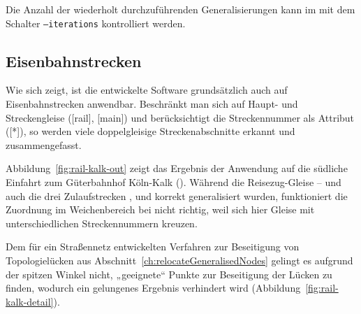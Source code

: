 \documentclass[../main/thesis.tex]{subfiles}
\begin{document}

Die Anzahl der wiederholt durchzuführenden Generalisierungen kann im  mit dem Schalter \texttt{--iterations} kontrolliert werden.




\subsection{Eisenbahnstrecken}

Wie sich zeigt, ist die entwickelte Software grundsätzlich auch auf Eisenbahnstrecken anwendbar.
Beschränkt man sich auf Haupt- und Streckengleise ([rail], [main]) und berücksichtigt die Streckennummer als Attribut ([*]), so werden viele doppelgleisige Streckenabschnitte erkannt und zusammengefasst.

Abbildung~\ref{fig:rail-kalk-out} zeigt das Ergebnis der Anwendung auf die südliche Einfahrt zum Güterbahnhof Köln-Kalk ().
Während die Reisezug-Gleise -- und auch die drei Zulaufstrecken ,  und  korrekt generalisiert wurden, funktioniert die Zuordnung im Weichenbereich bei  nicht richtig, weil sich hier Gleise mit unterschiedlichen Streckennummern kreuzen.

Dem für ein Straßennetz entwickelten Verfahren zur Beseitigung von Topologielücken aus Abschnitt~\ref{ch:relocateGeneralisedNodes} gelingt es aufgrund der spitzen Winkel nicht, „geeignete“ Punkte zur Beseitigung der Lücken zu finden, wodurch ein gelungenes Ergebnis verhindert wird (Abbildung~\ref{fig:rail-kalk-detail}).
\end{document}
